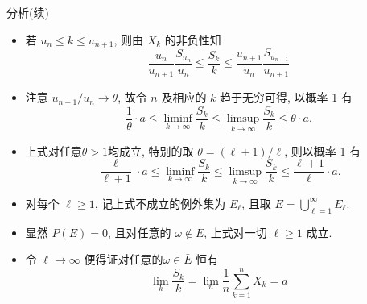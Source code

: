 \documentclass[Prob-All.tex]{subfiles}
\begin{document}
\begin{frame}{分析(续)}
\begin{itemize}[<+-|alert@+>]
\item 若 \( u_{n} \leq k \leq u_{n+1} \), 则由 \( X_{k} \) 的非负性知
\[
\frac{u_{n}}{u_{n+1}} \frac{S_{u_{n}}}{u_{n}} \leq \frac{S_{k}}{k} \leq \frac{u_{n+1}}{u_{n}} \frac{S_{u_{n+1}}}{u_{n+1}}
\]

\item 注意 \( u_{n+1} / u_{n} \rightarrow \theta \), 故令 \( n\) 及相应的 \( k \) 趋于无穷可得, 以概率 1 有
\[
\frac{1}{\theta} \cdot a \leq \liminf_{k\rightarrow\infty} \frac{S_{k}}{k} \leq \limsup_{k\rightarrow\infty} \frac{S_{k}}{k} \leq \theta\cdot a.
\]
\item 上式对任意$\theta>1$均成立, 特别的取 \( \theta=(\ell+1) / \ell \), 则以概率 1 有
\[
\frac{\ell}{\ell+1} \cdot a  \leq \liminf_{k\rightarrow\infty} \frac{S_{k}}{k} \leq \limsup_{k\rightarrow\infty} \frac{S_{k}}{k} \leq \frac{\ell+1}{\ell} \cdot a .
\]

\item 对每个 \( \ell \geq 1 \), 记上式不成立的例外集为 \( E_{\ell} \), 且取 \( E=\bigcup_{\ell=1}^{\infty} E_{\ell} \).
\item 显然 \( P(E)=0 \), 且对任意的 \(\omega\notin E \), 上式对一切 \( \ell \geq 1 \) 成立.
\item 令 \( \ell \rightarrow \infty \) 便得证对任意的\(\omega\in \bar{E} \) 恒有
\[
\lim _{k} \frac{S_{k}}{k}=\lim _{n} \frac{1}{n} \sum_{k=1}^{n} X_{k}=a
\]
\end{itemize}



\end{frame}
\end{document}
